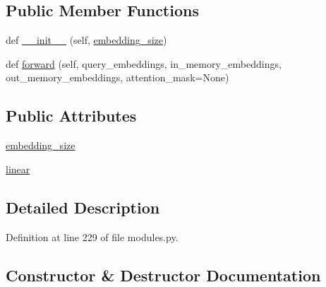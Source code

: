 \subsection*{Public Member Functions}
\begin{DoxyCompactItemize}
\item 
def \hyperlink{classprojects_1_1memnn__feedback_1_1agent_1_1modules_1_1Hop_a389f38122323e5f5f74241656a0df48a}{\+\_\+\+\_\+init\+\_\+\+\_\+} (self, \hyperlink{classprojects_1_1memnn__feedback_1_1agent_1_1modules_1_1Hop_a8fb50dd7d635522ebe5b2d36f6d4bc48}{embedding\+\_\+size})
\item 
def \hyperlink{classprojects_1_1memnn__feedback_1_1agent_1_1modules_1_1Hop_a49bc88135a02e336541fba3798321df8}{forward} (self, query\+\_\+embeddings, in\+\_\+memory\+\_\+embeddings, out\+\_\+memory\+\_\+embeddings, attention\+\_\+mask=None)
\end{DoxyCompactItemize}
\subsection*{Public Attributes}
\begin{DoxyCompactItemize}
\item 
\hyperlink{classprojects_1_1memnn__feedback_1_1agent_1_1modules_1_1Hop_a8fb50dd7d635522ebe5b2d36f6d4bc48}{embedding\+\_\+size}
\item 
\hyperlink{classprojects_1_1memnn__feedback_1_1agent_1_1modules_1_1Hop_a373c95e927a46152f811742f2653030f}{linear}
\end{DoxyCompactItemize}


\subsection{Detailed Description}


Definition at line 229 of file modules.\+py.



\subsection{Constructor \& Destructor Documentation}
\mbox{\label{classprojects_1_1memnn__feedback_1_1agent_1_1modules_1_1Hop_a389f38122323e5f5f74241656a0df48a}} 
